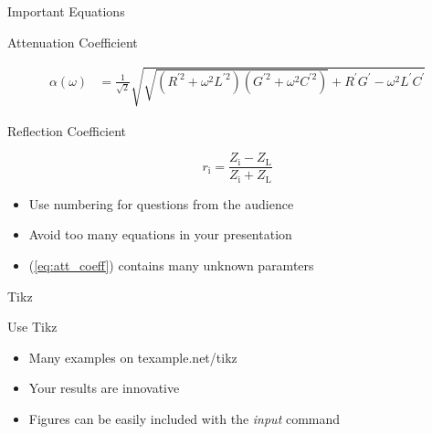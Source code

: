 \documentclass[english,american,german,aspectratio=43]{beamer}
\begin{document}
\begin{frame}{Important Equations}

  \begin{block}{Attenuation Coefficient}

    \begin{align}
      \alpha\left(\omega\right) &
      =\frac{1}{\sqrt{2}}\sqrt{\sqrt{\left(R^{\prime2}+\omega^{2}L^{\prime2}\right)\left(G^{\prime2}+\omega^{2}C^{\prime2}\right)}+R^{\prime}G^{\prime}-\omega^{2}L^{\prime}C^{\prime}}\label{eq:att_coeff}
    \end{align}

  \end{block}

  \begin{block}{Reflection Coefficient}

    \begin{equation}
      r_{\mathrm{i}}=\frac{Z_{\mathrm{i}}-Z{}_{\mathrm{L}}}{Z_{\mathrm{i}}+Z{}_{\mathrm{L}}}
    \end{equation}

  \end{block}
  \begin{itemize}
    \item Use numbering for questions from the audience
    \item Avoid too many equations in your presentation
    \item (\ref{eq:att_coeff}) contains many unknown paramters
  \end{itemize}
\end{frame}

\begin{frame}{Tikz}

  \begin{center}
    \begin{figure}
      \scalebox{0.75}{}
    \end{figure}
    \par
  \end{center}
  \begin{block}{Use Tikz}

    \begin{itemize}
      \item Many examples on texample.net/tikz
      \item Your results are innovative
      \item Figures can be easily included with the \textit{input} command
    \end{itemize}
  \end{block}
\end{frame}
\end{document}
